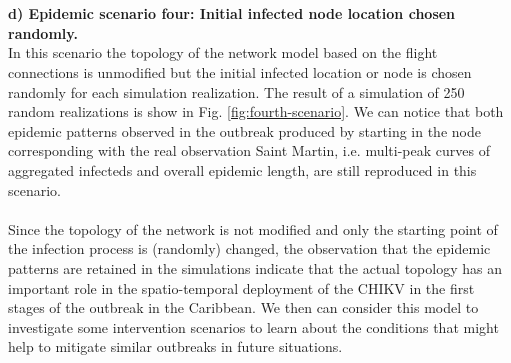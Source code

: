 \documentclass[10pt,a4paper]{article}
\begin{document}
\\\\
\textbf{d) Epidemic scenario four: Initial infected node location chosen randomly.}\\
In this scenario the topology of the network model based on the flight connections is unmodified but the initial infected location or node is chosen randomly for each simulation realization. The result of a simulation of 250 random realizations is show in Fig. \ref{fig:fourth-scenario}. We can notice that both epidemic patterns observed in the outbreak produced by starting in the node corresponding with the real observation Saint Martin, i.e. multi-peak curves of aggregated infecteds and overall epidemic length, are still reproduced in this scenario. 
\\\\
Since the topology of the network is not modified and only the starting point of the infection process is (randomly) changed, the observation that the epidemic patterns are retained in the simulations indicate that the actual topology has an important role in the spatio-temporal deployment of the CHIKV in the first stages of the outbreak in the Caribbean.  We then can consider this model to investigate some intervention scenarios to learn about the conditions that might help to mitigate similar outbreaks in future situations.
%
\end{document}
